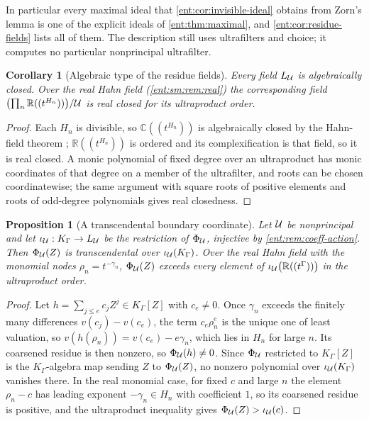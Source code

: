 \documentclass[11pt]{article}
\theoremstyle{plain}
\theoremstyle{plain}
\newtheorem{proposition}[proposition]{Proposition}
\theoremstyle{plain}
\newtheorem{corollary}[corollary]{Corollary}
\theoremstyle{definition}
\theoremstyle{definition}
\theoremstyle{definition}
\theoremstyle{definition}
\theoremstyle{remark}
\newcommand{\C}{\mathbb C}\newcommand{\R}{\mathbb R}
\newcommand{\K}{K_\Gamma}\newcommand{\KD}{K_\Delta}
\begin{document}
In particular every maximal ideal that \cref{ent:cor:invisible-ideal}
obtains from Zorn's lemma is one of the explicit ideals of
\cref{ent:thm:maximal}, and \cref{ent:cor:residue-fields} lists all of them.
The description still uses ultrafilters and choice; it computes no
particular nonprincipal ultrafilter.

\begin{corollary}[Algebraic type of the residue fields]
\label{ent:sm:cor:boundary-fields}
Every field $L_\mathcal U$ is algebraically closed. Over the real Hahn field
(\cref{ent:sm:rem:real}) the corresponding field
$\bigl(\prod_n\R((t^{H_n}))\bigr)/\Ucal$ is real closed for its ultraproduct
order.
\end{corollary}
\begin{proof}
Each $H_n$ is divisible, so $\C((t^{H_n}))$ is algebraically closed by the
Hahn-field theorem \cite[Corollary~4]{Poonen}; $\R((t^{H_n}))$ is ordered and
its complexification is that field, so it is real closed. A monic polynomial
of fixed degree over an ultraproduct has monic coordinates of that degree on
a member of the ultrafilter, and roots can be chosen coordinatewise; the same
argument with square roots of positive elements and roots of odd-degree
polynomials gives real closedness.
\end{proof}

\begin{proposition}[A transcendental boundary coordinate]
\label{ent:sm:prop:transcendental}
Let $\mathcal U$ be nonprincipal and let $\iota_\Ucal:\K\to L_\Ucal$ be the
restriction of $\Phi_\mathcal U$, injective by \cref{ent:rem:coeff-action}. Then
$\Phi_\mathcal U(Z)$ is transcendental over $\iota_\Ucal(\K)$. Over the real Hahn
field with the monomial nodes $\rho_n=t^{-\gamma_n}$, $\Phi_\mathcal U(Z)$ exceeds
every element of $\iota_\Ucal\bigl(\R((t^\Gamma))\bigr)$ in the ultraproduct
order.
\end{proposition}
\begin{proof}
Let $h=\sum_{j\le e}c_jZ^j\in\K[Z]$ with $c_e\ne0$. Once $\gamma_n$ exceeds
the finitely many differences $v(c_j)-v(c_e)$, the term $c_e\rho_n^e$ is the
unique one of least valuation, so $v(h(\rho_n))=v(c_e)-e\gamma_n$, which lies
in $H_n$ for large $n$. Its coarsened residue is then nonzero, so
$\Phi_\mathcal U(h)\ne0$. Since $\Phi_\mathcal U$ restricted to $\K[Z]$ is the
$\K$-algebra map sending $Z$ to $\Phi_\mathcal U(Z)$, no nonzero polynomial over
$\iota_\Ucal(\K)$ vanishes there. In the real monomial case, for fixed $c$
and large $n$ the element $\rho_n-c$ has leading exponent $-\gamma_n\in H_n$
with coefficient $1$, so its coarsened residue is positive, and the
ultraproduct inequality gives $\Phi_\mathcal U(Z)>\iota_\mathcal U(c)$.
\end{proof}
\end{document}
